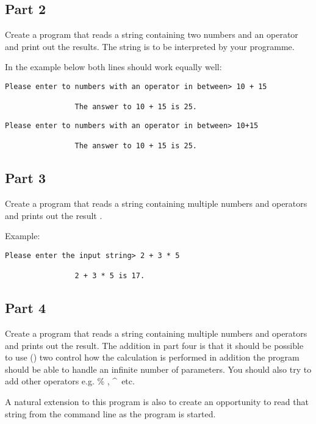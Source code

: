 \documentclass{article}
\begin{document}
		\subsection{Part 2}
			Create a program that reads a string containing two numbers and an operator and print out the results. The string is to be interpreted by your programme. 
			
			In the example below both lines should work equally well:
			
			\begin{lstlisting}[numbers=none]
				Please enter to numbers with an operator in between> 10 + 15
				
				The answer to 10 + 15 is 25.
			\end{lstlisting}

			

			\begin{lstlisting}[numbers=none]
				Please enter to numbers with an operator in between> 10+15
				
				The answer to 10 + 15 is 25.
			\end{lstlisting}
			
		\subsection{Part 3}
			Create a program that reads a string containing multiple numbers and operators and prints out the result .
			
			Example:
			\begin{lstlisting}[numbers=none]
				Please enter the input string> 2 + 3 * 5
				
				2 + 3 * 5 is 17.
			\end{lstlisting}
		\subsection{Part 4}
			Create a program that reads a string containing multiple numbers and operators and prints out the result. The addition in part four is that it should be possible to use () two control how the calculation is performed in addition the program should be able to handle an infinite number of parameters. You should also try to add other operators e.g.  \% , \^~etc.
			
			A natural extension to this program is also to create an opportunity to read that string from the command line as the program is started.
			
\end{document}
